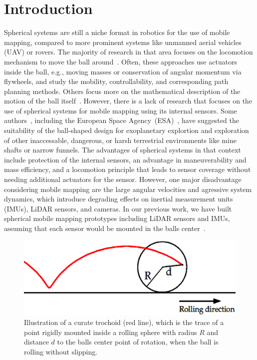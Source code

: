 \section{Introduction}

Spherical systems are still a niche format in robotics for the use of mobile mapping, compared to more prominent systems like unmanned aerial vehicles (UAV) or rovers.
The majority of research in that area focuses on the locomotion mechanism to move the ball around~\cite{Chen2013, Ylikorpi2007, Chase2012, Joshi2010, Anwar2014}.
Often, these approaches use actuators inside the ball, e.g., moving masses or conservation of angular momentum via flywheels, and study the mobility, controllability, and corresponding path planning methods.
Others focus more on the mathematical description of the motion of the ball itself~\cite{Hogan2015Modeling, Mamaev2020Dynamics, Burkhardt2016Reduced, omark2020, fiori2024lie}. 
However, there is a lack of research that focuses on the use of spherical systems for mobile mapping using its internal sensors.
Some authors~\cite{s22041413, Li2023Special, Bruhn2008A}, including the European Space Agency~(ESA)~\cite{ESA}, have suggested the suitability of the ball-shaped design for exoplanetary explortion and exploration of other inaccessable, dangerous, or harsh terrestrial environments like mine shafts or narrow funnels.
The advantages of spherical systems in that context include protection of the internal sensors, an advantage in maneuverability and mass efficiency, and a locomotion principle that leads to sensor coverage without needing additional actuators for the sensor.
However, one major disadvantage considering mobile mapping are the large angular velocities and agressive system dynamics, which introduce degrading effects on inertial measurement units (IMUs), LiDAR sensors, and cameras.
In our previous work, we have built spherical mobile mapping prototypes including LiDAR sensors and IMUs, assuming that each sensor would be mounted in the balls center~\cite{9591183, ARZBERGER2021100004, 10256359}.
\begin{figure}
  \centering
  \includegraphics[width=\linewidth]{img/trochoidanim}
  \caption{Illustration of a curate trochoid (red line), which is the trace of a point rigidly mounted inside a rolling sphere with radius $R$ and distance $d$ to the balls center point of rotation, when the ball is rolling without slipping.}
  \label{fig:trochoidanim}
\end{figure}
